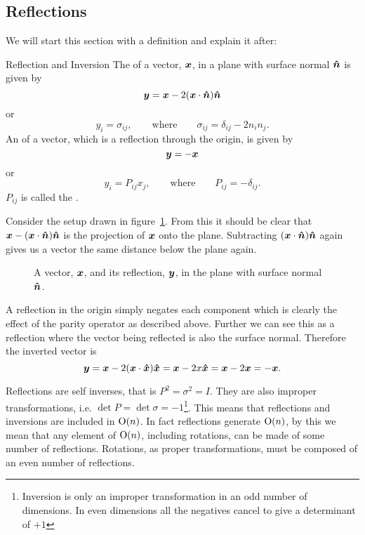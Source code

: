 \subsection{Reflections}
We will start this section with a definition and explain it after:
\begin{definition}{Reflection and Inversion}{}
    The  of a vector, \(\bm{x}\), in a plane with surface normal \(\bm{\hat{n}}\) is given by
    \[\bm{y} = \bm{x} - 2(\bm{x}\cdot\bm{\hat{n}})\bm{\hat{n}}\]
    or
    \[y_i = \sigma_{ij}, \qquad\text{where}\qquad \sigma_{ij} = \delta_{ij} - 2n_in_j.\]
    An  of a vector, which is a reflection through the origin, is given by
    \[\bm{y} = -\bm{x}\]
    or
    \[y_i = P_{ij}x_j, \qquad\text{where}\qquad P_{ij} = -\delta_{ij}.\]
    \(P_{ij}\) is called the .
\end{definition}
Consider the setup drawn in figure~\ref{fig:reflected vector}.
From this it should be clear that \(\bm{x} - (\bm{x}\cdot\bm{\hat{n}})\bm{\hat{n}}\) is the projection of \(\bm{x}\) onto the plane.
Subtracting \((\bm{x}\cdot\bm{\hat{n}})\bm{\hat{n}}\) again gives us a vector the same distance below the plane again.
\begin{figure}[ht]
    \centering
    \caption{A vector, \(\bm{x}\), and its reflection, \(\bm{y}\), in the plane with surface normal \(\bm{\hat{n}}\).}
    \label{fig:reflected vector}
\end{figure}

A reflection in the origin simply negates each component which is clearly the effect of the parity operator as described above.
Further we can see this as a reflection where the vector being reflected is also the surface normal.
Therefore the inverted vector is
\[\bm{y} = \bm{x} - 2(\bm{x}\cdot\bm{\hat{x}})\bm{\hat{x}} = \bm{x} - 2x\bm{\hat{x}} = \bm{x} - 2\bm{x} = -\bm{x}.\]

Reflections are self inverses, that is \(P^2 = \sigma^2 = I\).
They are also improper transformations, i.e. \(\det P = \det\sigma = -1\)\footnote{Inversion is only an improper transformation in an odd number of dimensions. In even dimensions all the negatives cancel to give a determinant of \(+1\)}.
This means that reflections and inversions are included in \(\mathrm{O}(n)\).
In fact reflections generate \(\mathrm{O}(n)\), by this we mean that any element of \(\mathrm{O}(n)\), including rotations, can be made of some number of reflections.
Rotations, as proper transformations, must be composed of an even number of reflections.

